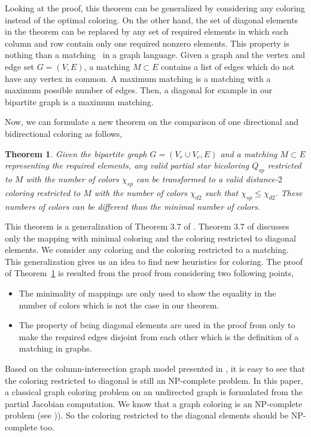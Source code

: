 \documentclass[12pt, twoside,a4paper,toc=bibliography]{scrbook}
\newtheorem{theorem}{Theorem}
\begin{document}
Looking at the proof, this theorem can be generalized by considering any
coloring instead of the optimal coloring.
On the other hand, the set of diagonal elements in the theorem
can be replaced by any set of required elements
in which each column and row contain only one required nonzero elements.
This property is nothing than a matching~\cite{bondy2008graph} in a graph language.
Given a graph and the vertex and edge set $G=(V,E)$, a matching $M\subset E$ contains
a list of edges which do not have any vertex in common.
A maximum matching is a matching with a maximum possible number of edges.
Then, a diagonal for example in our bipartite graph is a maximum matching.

Now, we can formulate a new theorem on the comparison of one directional and
bidirectional coloring as follows,
\begin{theorem}
\label{t.matching}
Given the bipartite graph $G=(V_r\cup V_c,E)$ and a matching $M\subset E$ representing
the required elements, any valid partial star bicoloring $Q_{sp}$ restricted to $M$
with the number of colors $\chi_{sp}$
can be transformed to a valid distance-$2$ coloring restricted to $M$
with the number of colors $\chi_{d2}$ such that $\chi_{sp} \leq \chi_{d2}$.
These numbers of colors can be different than the minimal number of colors.
\end{theorem}
This theorem is a generalization of Theorem 3.7 of \cite{Lulfesmann2012Fap}.
Theorem 3.7 of \cite{Lulfesmann2012Fap} discusses only the mapping with minimal coloring
and the coloring restricted to diagonal elements. We consider any coloring
and the coloring restricted to a matching. This generalization gives us an idea
to find new heuristics for coloring. The proof of Theorem~\ref{t.matching}
is resulted from the proof from \cite{Lulfesmann2012Fap} considering two following points,
\begin{itemize}
\item The minimality of mappings are only used to show the equality in the number of colors which is not
the case in our theorem.
\item The property of being diagonal elements are used in the proof from \cite{Lulfesmann2012Fap} only to
make the required edges disjoint from each other which is the definition of a matching in graphs.
\end{itemize}

Based on the column-intersection graph model presented in \cite{cscpaper},
it is easy to see
that the coloring restricted to diagonal is still an NP-complete problem.
In this paper, a classical graph coloring problem on an undirected graph
is formulated from the partial Jacobian computation.
We know that a graph coloring is an NP-complete problem
(see \cite{np-complet-graph-coloring})).
So the coloring restricted to the diagonal elements should be NP-complete too.
\end{document}
